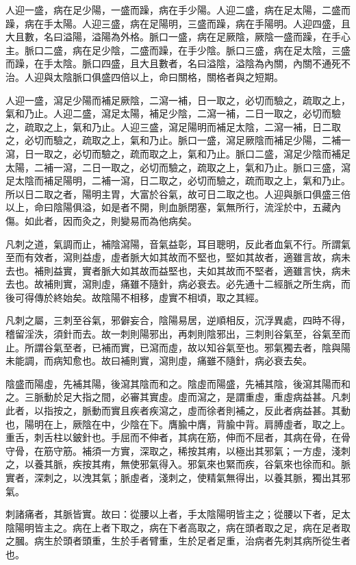 人迎一盛，病在足少陽，一盛而躁，病在手少陽。人迎二盛，病在足太陽，二盛而躁，病在手太陽。人迎三盛，病在足陽明，三盛而躁，病在手陽明。人迎四盛，且大且數，名曰溢陽，溢陽為外格。脈口一盛，病在足厥陰，厥陰一盛而躁，在手心主。脈口二盛，病在足少陰，二盛而躁，在手少陰。脈口三盛，病在足太陰，三盛而躁，在手太陰。脈口四盛，且大且數者，名曰溢陰，溢陰為內關，內關不通死不治。人迎與太陰脈口俱盛四倍以上，命曰關格，關格者與之短期。

人迎一盛，瀉足少陽而補足厥陰，二瀉一補，日一取之，必切而驗之，疏取之上，氣和乃止。人迎二盛，瀉足太陽，補足少陰，二瀉一補，二日一取之，必切而驗之，疏取之上，氣和乃止。人迎三盛，瀉足陽明而補足太陰，二瀉一補，日二取之，必切而驗之，疏取之上，氣和乃止。脈口一盛，瀉足厥陰而補足少陽，二補一瀉，日一取之，必切而驗之，疏而取之上，氣和乃止。脈口二盛，瀉足少陰而補足太陽，二補一瀉，二日一取之，必切而驗之，疏取之上，氣和乃止。脈口三盛，瀉足太陰而補足陽明，二補一瀉，日二取之，必切而驗之，疏而取之上，氣和乃止。所以日二取之者，陽明主胃，大富於谷氣，故可日二取之也。人迎與脈口俱盛三倍以上，命曰陰陽俱溢，如是者不開，則血脈閉塞，氣無所行，流淫於中，五藏內傷。如此者，因而灸之，則變易而為他病矣。

凡刺之道，氣調而止，補陰瀉陽，音氣益彰，耳目聰明，反此者血氣不行。所謂氣至而有效者，瀉則益虛，虛者脈大如其故而不堅也，堅如其故者，適雖言故，病未去也。補則益實，實者脈大如其故而益堅也，夫如其故而不堅者，適雖言快，病未去也。故補則實，瀉則虛，痛雖不隨針，病必衰去。必先通十二經脈之所生病，而後可得傳於終始矣。故陰陽不相移，虛實不相頃，取之其經。

凡刺之屬，三刺至谷氣，邪僻妄合，陰陽易居，逆順相反，沉浮異處，四時不得，稽留淫泆，須針而去。故一刺則陽邪出，再刺則陰邪出，三刺則谷氣至，谷氣至而止。所謂谷氣至者，已補而實，已瀉而虛，故以知谷氣至也。邪氣獨去者，陰與陽未能調，而病知愈也。故曰補則實，瀉則虛，痛雖不隨針，病必衰去矣。

陰盛而陽虛，先補其陽，後瀉其陰而和之。陰虛而陽盛，先補其陰，後瀉其陽而和之。三脈動於足大指之間，必審其實虛。虛而瀉之，是謂重虛，重虛病益甚。凡刺此者，以指按之，脈動而實且疾者疾瀉之，虛而徐者則補之，反此者病益甚。其動也，陽明在上，厥陰在中，少陰在下。膺腧中膺，背腧中背。肩膊虛者，取之上。重舌，刺舌柱以鈹針也。手屈而不伸者，其病在筋，伸而不屈者，其病在骨，在骨守骨，在筋守筋。補須一方實，深取之，稀按其痏，以極出其邪氣；一方虛，淺刺之，以養其脈，疾按其痏，無使邪氣得入。邪氣來也緊而疾，谷氣來也徐而和。脈實者，深刺之，以洩其氣；脈虛者，淺刺之，使精氣無得出，以養其脈，獨出其邪氣。

刺諸痛者，其脈皆實。故曰：從腰以上者，手太陰陽明皆主之；從腰以下者，足太陰陽明皆主之。病在上者下取之，病在下者高取之，病在頭者取之足，病在足者取之膕。病生於頭者頭重，生於手者臂重，生於足者足重，治病者先刺其病所從生者也。

